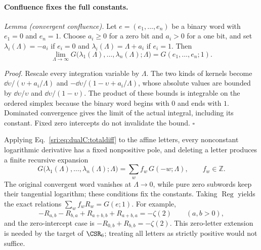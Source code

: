 \paragraph{Confluence fixes the full constants.} \emph{Lemma (convergent confluence).} Let $e=(e_1,\ldots,e_n)$ be a
binary word with $e_1=0$ and $e_n=1$. Choose $a_i\ge0$ for a zero bit and $a_i>0$ for a one bit, and set
$\lambda_i(\Lambda)=-a_i$ if $e_i=0$ and $\lambda_i(\Lambda)=\Lambda+a_i$ if $e_i=1$. Then
\begin{equation}
 \lim_{\Lambda\to\infty}G\bigl(\lambda_1(\Lambda),\ldots,\lambda_n(\Lambda);\Lambda\bigr)=G(e_1,\ldots,e_n;1).
 \label{sri:eq:dualC:confluence}
\end{equation}

\emph{Proof.} Rescale every integration variable by $\Lambda$. The two kinds of kernels become
$\dd\upsilon/(\upsilon+a_i/\Lambda)$ and $-\dd\upsilon/(1-\upsilon+a_i/\Lambda)$, whose absolute values are bounded by
$\dd\upsilon/\upsilon$ and $\dd\upsilon/(1-\upsilon)$. The product of these bounds is integrable on the ordered simplex
because the binary word begins with $0$ and ends with $1$. Dominated convergence gives the limit of the actual
integral, including its constant. Fixed zero intercepts do not invalidate the bound. $\square$

Applying Eq.~\eqref{sri:eq:dualC:totaldiff} to the affine letters, every nonconstant logarithmic derivative has a fixed
nonpositive pole, and deleting a letter produces a finite recursive expansion
\begin{equation}
 G\bigl(\lambda_1(\Lambda),\ldots,\lambda_n(\Lambda);\Lambda\bigr)=\sum_wf_w\,G(-w;\Lambda),\qquad f_w\in\mathbb Z.
\end{equation}
The original convergent word vanishes at $\Lambda\to0$, while pure zero subwords keep their tangential logarithm; these
conditions fix the constants. Taking $\operatorname{Reg}$ yields the exact relations $\sum_wf_wR_w=G(e;1)$. For example,
\begin{equation}
 -R_{a,b}-R_{b,a}+R_{a+b,b}+R_{a+b,a}=-\zeta(2)\qquad(a,b>0),
\end{equation}
and the zero-intercept case is $-R_{0,b}+R_{b,b}=-\zeta(2)$. This zero-letter extension is needed by the target of
$\CSR_6$; treating all letters as strictly positive would not suffice.

